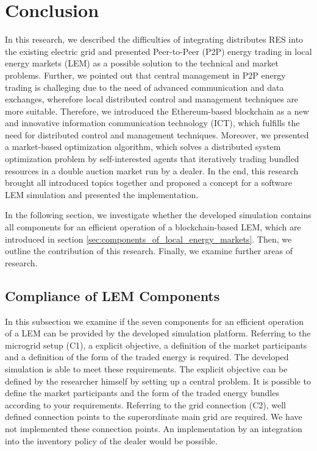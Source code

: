 \section{Conclusion}
In this research, we described the difficulties of integrating distributes RES into 
the existing electric grid and presented Peer-to-Peer (P2P) energy trading in local energy markets (LEM)
as a possible solution to the technical and market problems. Further, we pointed out that central
management in P2P energy trading is challeging due to the need of advanced communication and data exchanges,
wherefore local distributed control and management techniques are more suitable.
Therefore, we introduced the Ethereum-based blockchain as a new and innovative information communication
technology (ICT), which fulfills the need for distributed control and management techniques.
Moreover, we presented a market-based optimization algorithm, which solves a distributed system
optimization problem by self-interested agents that iteratively trading bundled resources in a double
auction market run by a dealer. 
In the end, this research brought all introduced topics together and proposed a concept for a software 
LEM simulation and presented the implementation. 

In the following section, we investigate whether the developed simulation contains all 
components for an efficient operation of a blockchain-based LEM, which are introduced in section \ref{sec:components_of_local_energy_markets}. 
Then, we outline the contribution of this research. Finally, we examine further areas of research.

\subsection{Compliance of LEM Components}
\label{sec:compliance_of_components}

In this subsection we examine if the seven components for an efficient operation of a LEM can be 
provided by the developed simulation platform.
Referring to the microgrid setup (C1), a explicit objective, a definition of the market participants 
and a definition of the form of the traded energy is required. The developed simulation 
is able to meet these requirements. The explicit objective can be defined by the researcher himself by 
setting up a central problem. It is possible to define the market participants and the form of the traded energy bundles
according to your requirements.
Referring to the grid connection (C2), well defined connection points to the superordinate main grid are required.
We have not implemented these connection points. An implementation by an integration into the inventory 
policy of the dealer would be possible. 



